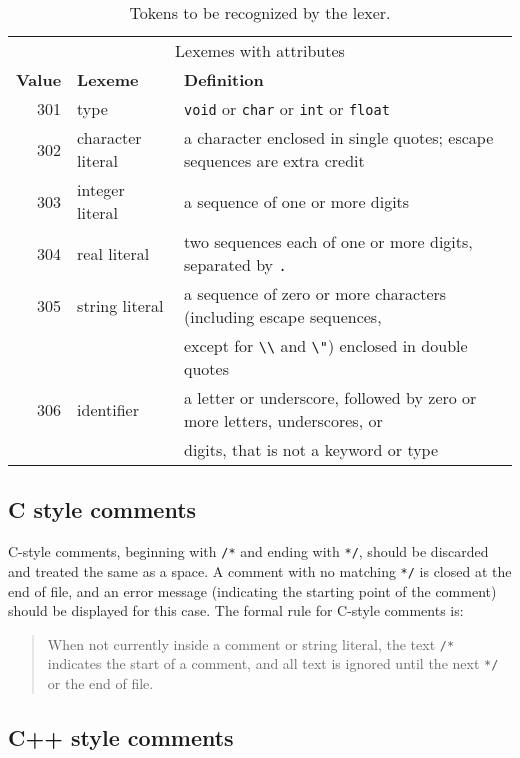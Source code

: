 \documentclass{article}
\begin{document}
\begin{table}[t]
	\begin{tabular}{rll}
		\\
		\multicolumn{3}{c}{Lexemes with attributes}
		\\[1mm]
		{\bf Value} & {\bf Lexeme} & {\bf Definition}
	  \\ \hline
		301 & type & \verb|void| or \verb|char| or \verb|int| or \verb|float|
		\\
		302 & character literal & a character enclosed in single quotes;
			escape sequences are extra credit
		\\
		303 & integer literal & a sequence of one or more digits
		\\
		304 & real literal & two sequences each of one or more digits, separated by \verb|.|
		\\
		305 & string literal & a sequence of zero or more characters (including escape sequences,
		\\ & & except for \verb|\\| and \verb|\"|) enclosed in double quotes
		\\
		306 & identifier & a letter or underscore, followed by zero or more letters,
			underscores, or
		\\ & & digits, that is not a keyword or type
	\end{tabular}

	\caption{Tokens to be recognized by the lexer.}
	\label{TAB:tokens}
\end{table}

\subsection{C style comments}

C-style comments, beginning with \verb|/*| and ending with \verb|*/|,
should be discarded and treated the same as a space.
A comment with no matching \verb|*/| is closed at the end of file,
and an error message
(indicating the starting point of the comment)
should be displayed for this case.
The formal rule for C-style comments is:
\begin{quote}
	When not currently inside a comment or string literal,
	the text \verb|/*| indicates the start of a comment,
	and all text is ignored until the next \verb|*/| or the end of file.
\end{quote}

\subsection{C++ style comments}
\end{document}
